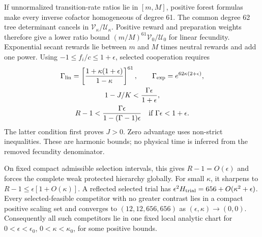 \documentclass[aps,pre,reprint,amsmath,amssymb,longbibliography]{revtex4-2}
\begin{document}
If unnormalized transition-rate ratios lie in $[m,M]$, positive forest
formulas~\cite{AGNamGunawardena2025} make every inverse cofactor
homogeneous of degree 61. The common
degree 62 tree determinant cancels in $\mathcal V_\kappa/\mathcal U_\kappa$.
Positive reward and preparation weights therefore give a lower ratio bound
$(m/M)^{61}\mathcal V_0/\mathcal U_0$ for linear fecundity. Exponential
secant rewards lie between $m$ and $M$ times neutral rewards and add one
power. Using $-1\leq f_i/c\leq1+\epsilon$, selected cooperation requires
\begin{equation}
 \begin{gathered}
 \Gamma_{\rm lin}=\left[\frac{1+\kappa(1+\epsilon)}{1-\kappa}\right]^{61},
 \qquad \Gamma_{\exp}=e^{62\kappa(2+\epsilon)},\\
 1-J/K<\frac{\Gamma\epsilon}{1+\epsilon},\\
 R-1<\frac{\Gamma\epsilon}{1-(\Gamma-1)\epsilon}
 \quad\text{if }\Gamma\epsilon<1+\epsilon.
 \end{gathered}
 \label{v3-eq-selected-global-forest-bound}
\end{equation}
The latter condition first proves $J>0$. Zero advantage uses non-strict
inequalities. These are harmonic bounds; no physical time is inferred from
the removed fecundity denominator.

On fixed compact admissible selection intervals, this gives $R-1=O(\epsilon)$
and forces the complete weak protected hierarchy globally. For small
$\kappa$, it sharpens to $R-1\leq\epsilon[1+O(\kappa)]$. A reflected
selected trial has $\epsilon^2H_{\rm trial}=656+O(\kappa^2+\epsilon)$.
Every selected-feasible competitor with no greater contrast lies in a compact
positive scaling set and converges to $(12,12,656,656)$ as
$(\epsilon,\kappa)\to(0,0)$. Consequently all such competitors lie in one
fixed local analytic chart for $0<\epsilon<\epsilon_0$,
$0<\kappa<\kappa_0$, for some positive bounds.
\end{document}
